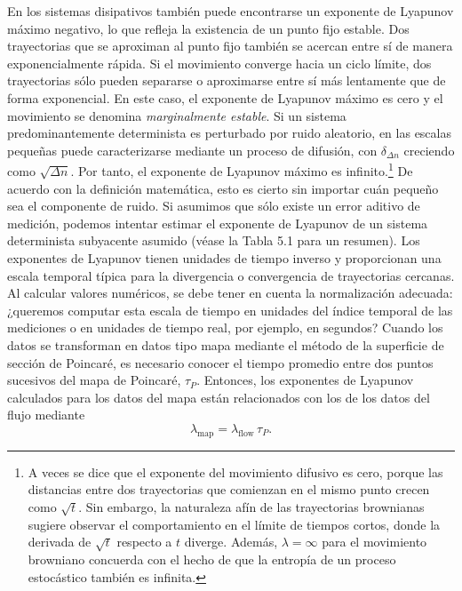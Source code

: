 \documentclass[10pt,a4paper]{book}
\begin{document}
En los sistemas disipativos también puede encontrarse un exponente de Lyapunov máximo negativo, lo que refleja la existencia de un punto fijo estable. Dos trayectorias que se aproximan al punto fijo también se acercan entre sí de manera exponencialmente rápida. Si el movimiento converge hacia un ciclo límite, dos trayectorias sólo pueden separarse o aproximarse entre sí más lentamente que de forma exponencial. En este caso, el exponente de Lyapunov máximo es cero y el movimiento se denomina \textit{marginalmente estable}. Si un sistema predominantemente determinista es perturbado por ruido aleatorio, en las escalas pequeñas puede caracterizarse mediante un proceso de difusión, con $\delta_{\Delta n}$ creciendo como $\sqrt{\Delta n}$. Por tanto, el exponente de Lyapunov máximo es infinito.\footnote{A veces se dice que el exponente del movimiento difusivo es cero, porque las distancias entre dos trayectorias que comienzan en el mismo punto crecen como $\sqrt{t}$. Sin embargo, la naturaleza afín de las trayectorias brownianas sugiere observar el comportamiento en el límite de tiempos cortos, donde la derivada de $\sqrt{t}$ respecto a $t$ diverge. Además, $\lambda = \infty$ para el movimiento browniano concuerda con el hecho de que la entropía de un proceso estocástico también es infinita.} De acuerdo con la definición matemática, esto es cierto sin importar cuán pequeño sea el componente de ruido. Si asumimos que sólo existe un error aditivo de medición, podemos intentar estimar el exponente de Lyapunov de un sistema determinista subyacente asumido (véase la Tabla 5.1 para un resumen). Los exponentes de Lyapunov tienen unidades de tiempo inverso y proporcionan una escala temporal típica para la divergencia o convergencia de trayectorias cercanas. Al calcular valores numéricos, se debe tener en cuenta la normalización adecuada: ¿queremos computar esta escala de tiempo en unidades del índice temporal de las mediciones o en unidades de tiempo real, por ejemplo, en segundos? Cuando los datos se transforman en datos tipo mapa mediante el método de la superficie de sección de Poincaré, es necesario conocer el tiempo promedio entre dos puntos sucesivos del mapa de Poincaré, $\tau_P$. Entonces, los exponentes de Lyapunov calculados para los datos del mapa están relacionados con los de los datos del flujo mediante
\begin{equation}
\lambda_{\text{map}} = \lambda_{\text{flow}} \, \tau_P.
\end{equation}

\newpage
\end{document}
